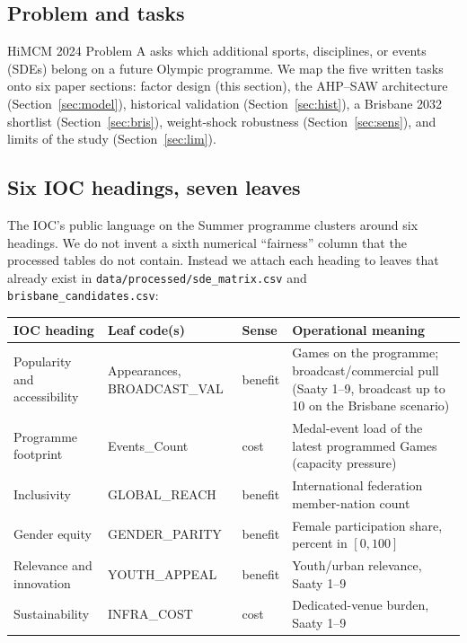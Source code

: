 \documentclass[12pt]{article}
\begin{document}
\subsection{Problem and tasks}

HiMCM 2024 Problem A asks which additional sports, disciplines, or events (SDEs)
belong on a future Olympic programme. We map the five written tasks onto six paper
sections: factor design (this section), the AHP--SAW architecture (Section~\ref{sec:model}),
historical validation (Section~\ref{sec:hist}), a Brisbane 2032 shortlist
(Section~\ref{sec:bris}), weight-shock robustness (Section~\ref{sec:sens}), and
limits of the study (Section~\ref{sec:lim}).

\subsection{Six IOC headings, seven leaves}

The IOC's public language on the Summer programme clusters around six headings.
We do not invent a sixth numerical ``fairness'' column that the processed tables do
not contain. Instead we attach each heading to leaves that already exist in
\texttt{data/processed/sde\_matrix.csv} and \texttt{brisbane\_candidates.csv}:

\begin{center}
\begin{tabular}{lllp{}}
\toprule
IOC heading & Leaf code(s) & Sense & Operational meaning \\
\midrule
Popularity and accessibility
  & Appearances, BROADCAST\_VAL
  & benefit
  & Games on the programme; broadcast/commercial pull (Saaty 1--9, broadcast up to 10
    on the Brisbane scenario) \\
Programme footprint
  & Events\_Count
  & cost
  & Medal-event load of the latest programmed Games (capacity pressure) \\
Inclusivity
  & GLOBAL\_REACH
  & benefit
  & International federation member-nation count \\
Gender equity
  & GENDER\_PARITY
  & benefit
  & Female participation share, percent in \([0,100]\) \\
Relevance and innovation
  & YOUTH\_APPEAL
  & benefit
  & Youth/urban relevance, Saaty 1--9 \\
Sustainability
  & INFRA\_COST
  & cost
  & Dedicated-venue burden, Saaty 1--9 \\
\bottomrule
\end{tabular}
\end{center}
\end{document}
